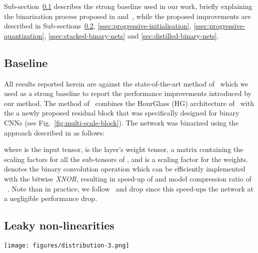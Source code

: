 \documentclass[10pt,twocolumn,letterpaper]{article}
\begin{document}
Sub-section~\ref{ssec:baseline} describes the strong baseline used in our work, briefly explaining the binarization process proposed in\cite{rastegari2016xnor} and~\cite{bulat2017binarized}, while the proposed improvements are described in Sub-sections~\ref{ssec:Symmetrical},  \ref{ssec:progressive-initialisation}, \ref{ssec:progressive-quantization}, \ref{ssec:stacked-binary-nets} and \ref{sec:distilled-binary-nets}.



\subsection{Baseline}\label{ssec:baseline}
All results reported herein are against the state-of-the-art method of~\cite{bulat2017binarized} which we used as a strong baseline to report the performance improvements introduced by our method. The method of~\cite{bulat2017binarized} combines the HourGlass (HG) architecture of~\cite{newell2016stacked} with the a newly proposed residual block that was specifically designed for binary CNNs (see Fig.~\ref{fig:multi-scale-block}). The network was binarized using the approach described in \cite{rastegari2016xnor} as follows:

where  is the input tensor,  is the layer's weight tensor,  a matrix containing the scaling factors for all the sub-tensors of , and  is a scaling factor for the weights.  denotes the binary convolution operation which can be efficiently implemented with the bitwise \textit{XNOR}, resulting in speed-up of  and model compression ratio of ~\cite{rastegari2016xnor}. Note than in practice, we follow~\cite{bulat2017binarized,rastegari2016xnor} and drop  since this speed-ups the network at a negligible performance drop. 

\subsection{Leaky non-linearities} \label{ssec:Symmetrical}

\begin{figure*}[!htbp]
    \centering
    \texttt{[image: figures/distribution-3.png]}
    \caption{Weight distribution for various layers from a network using PReLU (first row) and ReLU (second row) as we advance in the network (from left to right). The ReLU tends to push the weights closer to 0 making a jump between states more likely, thus causing the observed instabilities.}
    \label{fig:weights-distribution}
\end{figure*}
\end{document}
